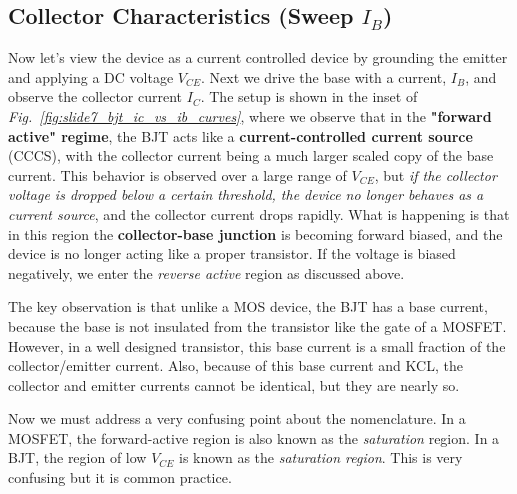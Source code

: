 \subsection{Collector Characteristics \texorpdfstring{(Sweep $I_B$)}{}}
Now let's view the device as a current controlled device by grounding the emitter and applying a DC voltage $V_{CE}$.  Next we drive the base with a current, $I_B$, and observe the collector current $I_C$.  The setup is shown in the inset of \emph{Fig.~\ref{fig:slide7_bjt_ic_vs_ib_curves}}, where we observe that in the \textbf{"forward active" regime}, the BJT acts like a \textbf{current-controlled current source} (CCCS), with the collector current being a much larger scaled copy of the base current.  This behavior is observed over a large range of $V_{CE}$, but \textit{if the collector voltage is dropped below a certain threshold, the device no longer behaves as a current source}, and the collector current drops rapidly.  What is happening is that in this region the \textbf{collector-base junction} is becoming forward biased, and the device is no longer acting like a proper transistor. If the voltage is biased negatively, we enter the \emph{reverse active} region as discussed above.

The key observation is that unlike a MOS device, the BJT has a base current, because the base is not insulated from the transistor like the gate of a MOSFET.  However, in a well designed transistor, this base current is a small fraction of the collector/emitter current.  Also, because of this base current and KCL, the collector and emitter currents cannot be identical, but they are nearly so.

Now we must address a very confusing point about the nomenclature.  In a MOSFET, the forward-active region is also known as the \emph{saturation} region.  In a BJT, the region of low $V_{CE}$ is known as the \emph{saturation region}.  This is very confusing but it is common practice.

